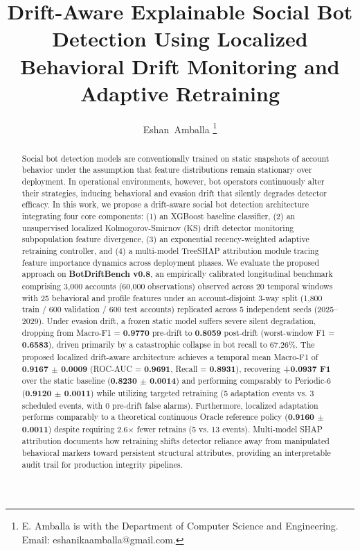 \documentclass[journal]{IEEEtran}
\begin{document}
\title{Drift-Aware Explainable Social Bot Detection Using Localized Behavioral Drift Monitoring and Adaptive Retraining}

\author{Eshan~Amballa%
\thanks{E. Amballa is with the Department of Computer Science and Engineering. Email: eshanikaamballa@gmail.com.}}

\maketitle

\begin{abstract}
Social bot detection models are conventionally trained on static snapshots of account behavior under the assumption that feature distributions remain stationary over deployment. In operational environments, however, bot operators continuously alter their strategies, inducing behavioral and evasion drift that silently degrades detector efficacy. In this work, we propose a drift-aware social bot detection architecture integrating four core components: (1) an XGBoost baseline classifier, (2) an unsupervised localized Kolmogorov-Smirnov (KS) drift detector monitoring subpopulation feature divergence, (3) an exponential recency-weighted adaptive retraining controller, and (4) a multi-model TreeSHAP attribution module tracing feature importance dynamics across deployment phases. We evaluate the proposed approach on \textbf{BotDriftBench v0.8}, an empirically calibrated longitudinal benchmark comprising 3,000 accounts (60,000 observations) observed across 20 temporal windows with 25 behavioral and profile features under an account-disjoint 3-way split (1,800 train / 600 validation / 600 test accounts) replicated across 5 independent seeds (2025--2029). Under evasion drift, a frozen static model suffers severe silent degradation, dropping from Macro-F1 = \textbf{0.9770} pre-drift to \textbf{0.8059} post-drift (worst-window F1 = \textbf{0.6583}), driven primarily by a catastrophic collapse in bot recall to 67.26\%. The proposed localized drift-aware architecture achieves a temporal mean Macro-F1 of \textbf{0.9167 $\pm$ 0.0009} (ROC-AUC = \textbf{0.9691}, Recall = \textbf{0.8931}), recovering \textbf{+0.0937 F1} over the static baseline (\textbf{0.8230 $\pm$ 0.0014}) and performing comparably to Periodic-6 (\textbf{0.9120 $\pm$ 0.0011}) while utilizing targeted retraining (5 adaptation events vs. 3 scheduled events, with 0 pre-drift false alarms). Furthermore, localized adaptation performs comparably to a theoretical continuous Oracle reference policy (\textbf{0.9160 $\pm$ 0.0011}) despite requiring 2.6$\times$ fewer retrains (5 vs. 13 events). Multi-model SHAP attribution documents how retraining shifts detector reliance away from manipulated behavioral markers toward persistent structural attributes, providing an interpretable audit trail for production integrity pipelines.
\end{abstract}
\end{document}
